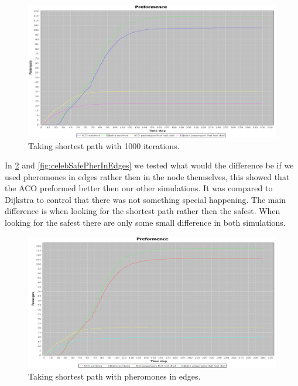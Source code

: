 \begin{figure} [h]
\centering
\hspace*{-1.0in}
\includegraphics[scale=0.35]{images/Graph-using-1000-rounds-140-passangers-shortest-path-and-one-fire.png}
\caption{Taking shortest path with 1000 iterations.}
\label{fig:celebShort1000round}
\end{figure}


In \ref{fig:celebShortPherInEdges} and \ref{fig:celebSafePherInEdges} we tested what would the difference be if we used pheromones in edges rather then in the node themselves, this showed that the ACO preformed better then our other simulations. It was compared to Dijkstra to control that there was not something special happening. The main difference is when looking for the shortest path rather then the safest. When looking for the safest there are only some small difference in both simulations.

\begin{figure} [h]
\centering
\hspace*{-1.0in}
\includegraphics[scale=0.35]{images/Graph-using-200-rounds-140-passangers-and-shortest-first-one-hazzard-and-ACO-having-pheremons-in-edges.png}
\caption{Taking shortest path with pheromones in edges.}
\label{fig:celebShortPherInEdges}
\end{figure}

